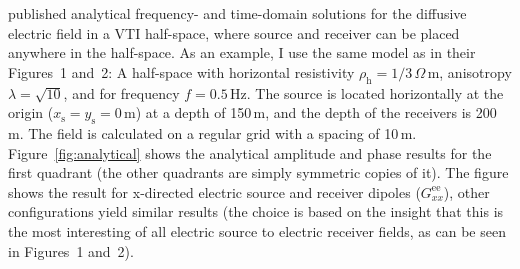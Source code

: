 \documentclass[paper]{geophysics}
\begin{document}
\cite{PIER.10.Slob} published analytical frequency- and time-domain solutions
for the diffusive electric field in a VTI half-space, where source and receiver
can be placed anywhere in the half-space. As an example, I use the same model
as \cite{GEO.15.Hunziker} in their Figures~1 and~2: A half-space with
horizontal resistivity $\rho_\mathrm{h} = 1/3\,\Omega$\,m, anisotropy $\lambda
= \sqrt{10}$, and for frequency $f = 0.5\,$Hz. The source is located
horizontally at the origin ($x_\mathrm{s} = y_\mathrm{s} = 0\,$m) at a depth of
150\,m, and the depth of the receivers is 200\,m. The field is calculated on a
regular grid with a spacing of 10\,m. Figure~\ref{fig:analytical} shows the
analytical amplitude and phase results for the first quadrant (the other
quadrants are simply symmetric copies of it).
%
%
The figure shows the result for x-directed electric source and receiver dipoles
($G^\mathrm{ee}_{xx}$), other configurations yield similar results (the choice
is based on the insight that this is the most interesting of all electric
source to electric receiver fields, as can be seen in \cite{GEO.15.Hunziker}
Figures~1 and~2).
\end{document}
